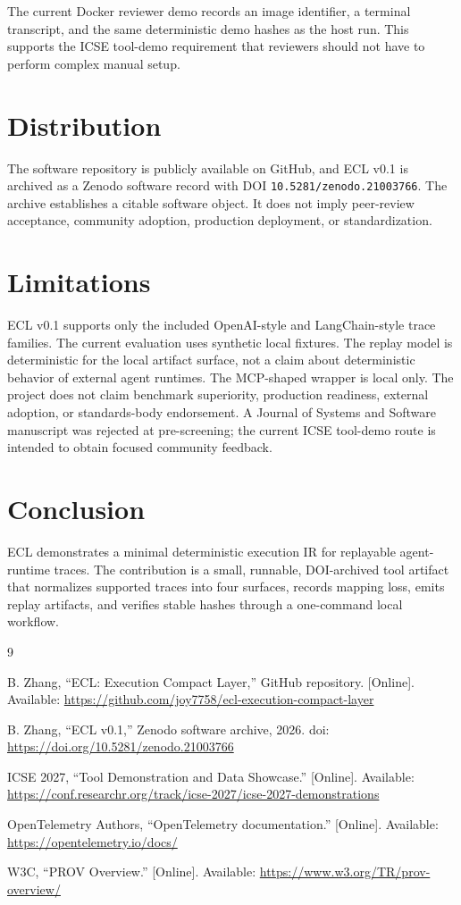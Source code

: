 \documentclass[10pt,conference]{IEEEtran}
\begin{document}
The current Docker reviewer demo records an image identifier, a terminal transcript, and the same deterministic demo hashes as the host run. This supports the ICSE tool-demo requirement that reviewers should not have to perform complex manual setup.

\section{Distribution}

The software repository is publicly available on GitHub, and ECL v0.1 is archived as a Zenodo software record with DOI \texttt{10.5281/zenodo.21003766}. The archive establishes a citable software object. It does not imply peer-review acceptance, community adoption, production deployment, or standardization.

\section{Limitations}

ECL v0.1 supports only the included OpenAI-style and LangChain-style trace families. The current evaluation uses synthetic local fixtures. The replay model is deterministic for the local artifact surface, not a claim about deterministic behavior of external agent runtimes. The MCP-shaped wrapper is local only. The project does not claim benchmark superiority, production readiness, external adoption, or standards-body endorsement. A Journal of Systems and Software manuscript was rejected at pre-screening; the current ICSE tool-demo route is intended to obtain focused community feedback.

\section{Conclusion}

ECL demonstrates a minimal deterministic execution IR for replayable agent-runtime traces. The contribution is a small, runnable, DOI-archived tool artifact that normalizes supported traces into four surfaces, records mapping loss, emits replay artifacts, and verifies stable hashes through a one-command local workflow.

\begin{thebibliography}{9}

B. Zhang, ``ECL: Execution Compact Layer,'' GitHub repository. [Online]. Available: \url{https://github.com/joy7758/ecl-execution-compact-layer}

B. Zhang, ``ECL v0.1,'' Zenodo software archive, 2026. doi: \url{https://doi.org/10.5281/zenodo.21003766}

ICSE 2027, ``Tool Demonstration and Data Showcase.'' [Online]. Available: \url{https://conf.researchr.org/track/icse-2027/icse-2027-demonstrations}

OpenTelemetry Authors, ``OpenTelemetry documentation.'' [Online]. Available: \url{https://opentelemetry.io/docs/}

W3C, ``PROV Overview.'' [Online]. Available: \url{https://www.w3.org/TR/prov-overview/}

\end{thebibliography}
\end{document}
